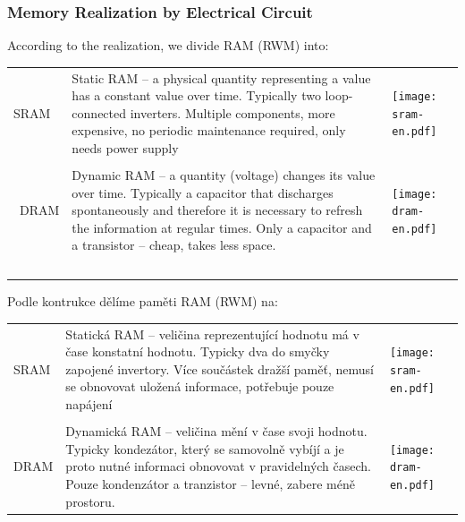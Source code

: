 \documentclass{beamer}
\begin{document}
\begin{frame}
\frametitle{Memory Realization by Electrical Circuit}

According to the realization, we divide RAM (RWM) into:
\bigskip

\begin{tabular}{m{0.8cm}m{6cm}m{4cm}}
SRAM & Static RAM -- a physical quantity representing a value has a constant value over time. Typically two loop-connected inverters. Multiple components, more expensive, no periodic maintenance required, only needs power supply& \texttt{[image: sram-en.pdf]} \\
\phantom{x} & \\\
DRAM & Dynamic RAM -- a quantity (voltage) changes its value over time. Typically a capacitor that discharges spontaneously and therefore it is necessary to refresh the information at regular times. Only a capacitor and a transistor -- cheap, takes less space. & \texttt{[image: dram-en.pdf]}\\\
\end{tabular}

Podle kontrukce dělíme paměti RAM (RWM) na:
\medskip

\begin{tabular}{m{0.8cm}m{6cm}m{4cm}}
SRAM & Statická RAM -- veličina reprezentující hodnotu má v čase konstatní hodnotu. Typicky dva do smyčky zapojené invertory. Více součástek dražší paměť, nemusí se obnovovat uložená informace, potřebuje pouze napájení & \texttt{[image: sram-en.pdf]} \\
\phantom{x} & & \\
DRAM & Dynamická RAM -- veličina mění v čase svoji hodnotu. Typicky kondezátor, který se samovolně vybíjí a je proto nutné informaci obnovovat v pravidelných časech. Pouze kondenzátor a tranzistor -- levné, zabere méně prostoru. & \texttt{[image: dram-en.pdf]}\\
\end{tabular}

\end{frame}
\end{document}
